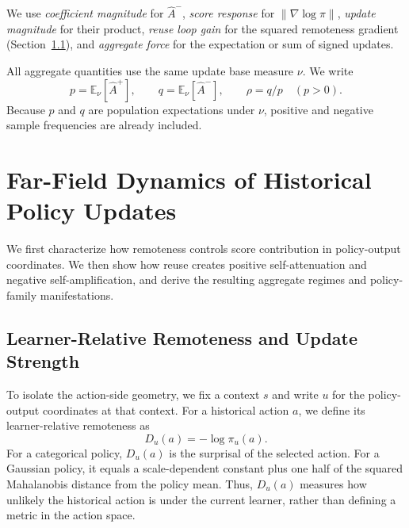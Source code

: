 \documentclass{article}
\theoremstyle{plain}
\theoremstyle{definition}
\theoremstyle{remark}
\begin{document}
We use \emph{coefficient magnitude} for \(\widehat A^-\), \emph{score
response} for \(\|\nabla\log\pi\|\), \emph{update magnitude} for their
product, \emph{reuse loop gain} for the squared remoteness gradient
(Section~\ref{sec:distance_strength}), and \emph{aggregate force} for the
expectation or sum of signed updates.

All aggregate quantities use the same update base measure \(\nu\). We write
\begin{equation}
    p=\mathbb E_\nu[\widehat A^+],
    \qquad
    q=\mathbb E_\nu[\widehat A^-],
    \qquad
    \rho=q/p \quad (p>0).
    \label{eq:aggregate_masses}
\end{equation}
Because \(p\) and \(q\) are population expectations under \(\nu\), positive
and negative sample frequencies are already included.

\section{Far-Field Dynamics of Historical Policy Updates}
\label{sec:theory}

We first characterize how remoteness controls score contribution in
policy-output coordinates. We then show how reuse creates positive
self-attenuation and negative self-amplification, and derive the resulting
aggregate regimes and policy-family manifestations.

\subsection{Learner-Relative Remoteness and Update Strength}
\label{sec:distance_strength}

To isolate the action-side geometry, we fix a context $s$ and write
$u$ for the policy-output coordinates at that context. For a historical
action $a$, we define its learner-relative remoteness as
\begin{equation}
    D_u(a)
    =
    -\log \pi_u(a).
    \label{eq:learner_relative_remoteness}
\end{equation}
For a categorical policy, $D_u(a)$ is the surprisal of the selected
action. For a Gaussian policy, it equals a scale-dependent constant plus
one half of the squared Mahalanobis distance from the policy mean.
Thus, $D_u(a)$ measures how unlikely the historical action is under the
current learner, rather than defining a metric in the action space.
\end{document}
